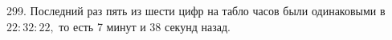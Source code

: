 299. Последний раз пять из шести цифр на табло часов были одинаковыми в $22:32:22,$ то есть 7 минут и 38 секунд назад.\\
